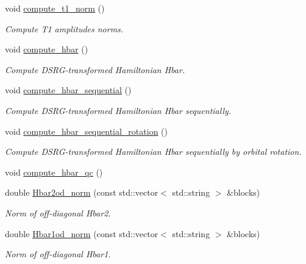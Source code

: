\begin{DoxyCompactItemize}
\item 
void \mbox{\hyperlink{classforte_1_1_m_r_d_s_r_g_aa919101d0d5c5d46f3e3fa143a4aeef8}{compute\+\_\+t1\+\_\+norm}} ()
\begin{DoxyCompactList}\small\item\em Compute T1 amplitudes norms. \end{DoxyCompactList}\item 
void \mbox{\hyperlink{classforte_1_1_m_r_d_s_r_g_aab4300bf4f2a6aa6f3c7c1c56687f3dc}{compute\+\_\+hbar}} ()
\begin{DoxyCompactList}\small\item\em Compute D\+S\+R\+G-\/transformed Hamiltonian Hbar. \end{DoxyCompactList}\item 
void \mbox{\hyperlink{classforte_1_1_m_r_d_s_r_g_a12e8d0131ba72e3365cb1cc62afd7977}{compute\+\_\+hbar\+\_\+sequential}} ()
\begin{DoxyCompactList}\small\item\em Compute D\+S\+R\+G-\/transformed Hamiltonian Hbar sequentially. \end{DoxyCompactList}\item 
void \mbox{\hyperlink{classforte_1_1_m_r_d_s_r_g_a4e86c76a6b247ac4c83402e099a7c43f}{compute\+\_\+hbar\+\_\+sequential\+\_\+rotation}} ()
\begin{DoxyCompactList}\small\item\em Compute D\+S\+R\+G-\/transformed Hamiltonian Hbar sequentially by orbital rotation. \end{DoxyCompactList}\item 
void \mbox{\hyperlink{classforte_1_1_m_r_d_s_r_g_ad927c13067ae69dcb0db61c1d47db19c}{compute\+\_\+hbar\+\_\+qc}} ()
\item 
double \mbox{\hyperlink{classforte_1_1_m_r_d_s_r_g_adde5d1649c7ab4cd4e5fd00aa4675dcb}{Hbar2od\+\_\+norm}} (const std\+::vector$<$ std\+::string $>$ \&blocks)
\begin{DoxyCompactList}\small\item\em Norm of off-\/diagonal Hbar2. \end{DoxyCompactList}\item 
double \mbox{\hyperlink{classforte_1_1_m_r_d_s_r_g_a2cee2929a90796e85b636d3e97ab974c}{Hbar1od\+\_\+norm}} (const std\+::vector$<$ std\+::string $>$ \&blocks)
\begin{DoxyCompactList}\small\item\em Norm of off-\/diagonal Hbar1. \end{DoxyCompactList}\item 

\end{DoxyCompactItemize}
